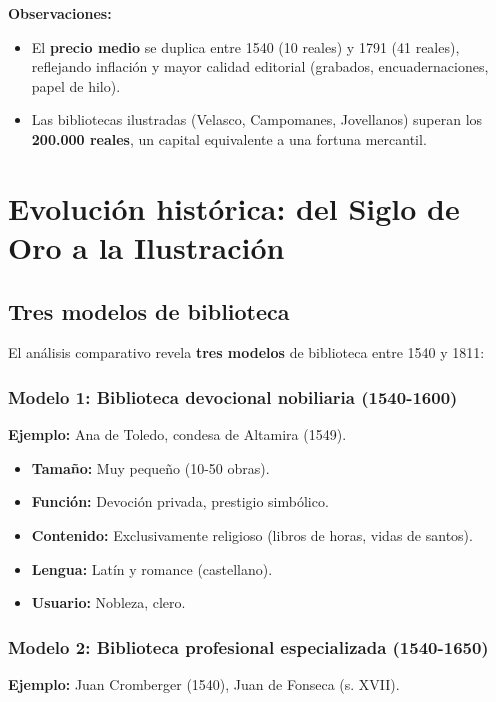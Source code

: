 \documentclass[12pt,a4paper]{article}
\begin{document}
\textbf{Observaciones:}

\begin{itemize}
\item El \textbf{precio medio} se duplica entre 1540 (10 reales) y 1791 (41 reales), reflejando inflación y mayor calidad editorial (grabados, encuadernaciones, papel de hilo).

\item Las bibliotecas ilustradas (Velasco, Campomanes, Jovellanos) superan los \textbf{200.000 reales}, un capital equivalente a una fortuna mercantil.
\end{itemize}

\section{Evolución histórica: del Siglo de Oro a la Ilustración}

\subsection{Tres modelos de biblioteca}

El análisis comparativo revela \textbf{tres modelos} de biblioteca entre 1540 y 1811:

\subsubsection{Modelo 1: Biblioteca devocional nobiliaria (1540-1600)}

\textbf{Ejemplo:} Ana de Toledo, condesa de Altamira (1549).

\begin{itemize}
\item \textbf{Tamaño:} Muy pequeño (10-50 obras).
\item \textbf{Función:} Devoción privada, prestigio simbólico.
\item \textbf{Contenido:} Exclusivamente religioso (libros de horas, vidas de santos).
\item \textbf{Lengua:} Latín y romance (castellano).
\item \textbf{Usuario:} Nobleza, clero.
\end{itemize}

\subsubsection{Modelo 2: Biblioteca profesional especializada (1540-1650)}

\textbf{Ejemplo:} Juan Cromberger (1540), Juan de Fonseca (s. XVII).
\end{document}
